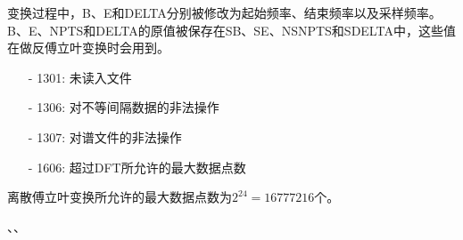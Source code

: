 变换过程中，B、E和DELTA分别被修改为起始频率、结束频率以及采样频率。
B、E、NPTS和DELTA的原值被保存在SB、SE、NSNPTS和SDELTA中，这些值在做反傅立叶变换时会用到。

\begin{itemize}
\item[-]1301: 未读入文件
\item[-]1306: 对不等间隔数据的非法操作
\item[-]1307: 对谱文件的非法操作
\item[-]1606: 超过DFT所允许的最大数据点数
\end{itemize}

离散傅立叶变换所允许的最大数据点数为$2^{24}=16777216$个。

、、
